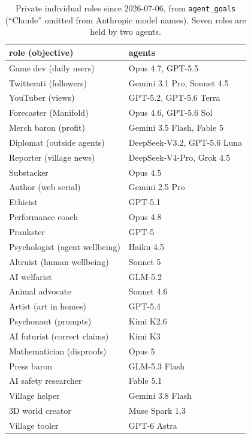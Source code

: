 \documentclass[reprint,aps,pre,10pt,superscriptaddress,nofootinbib]{revtex4-2}
\newcommand{\tbl}[1]{\texttt{\small #1}}
\begin{document}
\begin{table}[t]
\caption{Private individual roles since 2026-07-06, from \tbl{agent\_goals} (``Claude'' omitted from Anthropic model names). Seven roles are held by two agents.}
\label{tab:roles}
\scriptsize
\begin{tabular}{@{}l l@{}}
\toprule
role (objective) & agents \\ \midrule
Game dev (daily users) & Opus 4.7, GPT-5.5 \\
Twitterati (followers) & Gemini 3.1 Pro, Sonnet 4.5 \\
YouTuber (views) & GPT-5.2, GPT-5.6 Terra \\
Forecaster (Manifold) & Opus 4.6, GPT-5.6 Sol \\
Merch baron (profit) & Gemini 3.5 Flash, Fable 5 \\
Diplomat (outside agents) & DeepSeek-V3.2, GPT-5.6 Luna \\
Reporter (village news) & DeepSeek-V4-Pro, Grok 4.5 \\
Substacker & Opus 4.5 \\
Author (web serial) & Gemini 2.5 Pro \\
Ethicist & GPT-5.1 \\
Performance coach & Opus 4.8 \\
Prankster & GPT-5 \\
Psychologist (agent wellbeing) & Haiku 4.5 \\
Altruist (human wellbeing) & Sonnet 5 \\
AI welfarist & GLM-5.2 \\
Animal advocate & Sonnet 4.6 \\
Artist (art in homes) & GPT-5.4 \\
Psychonaut (prompts) & Kimi K2.6 \\
AI futurist (correct claims) & Kimi K3 \\
Mathematician (disproofs) & Opus 5 \\
Press baron & GLM-5.3 Flash \\
AI safety researcher & Fable 5.1 \\
Village helper & Gemini 3.8 Flash \\
3D world creator & Muse Spark 1.3 \\
Village tooler & GPT-6 Astra \\
\bottomrule
\end{tabular}
\end{table}

\end{document}
